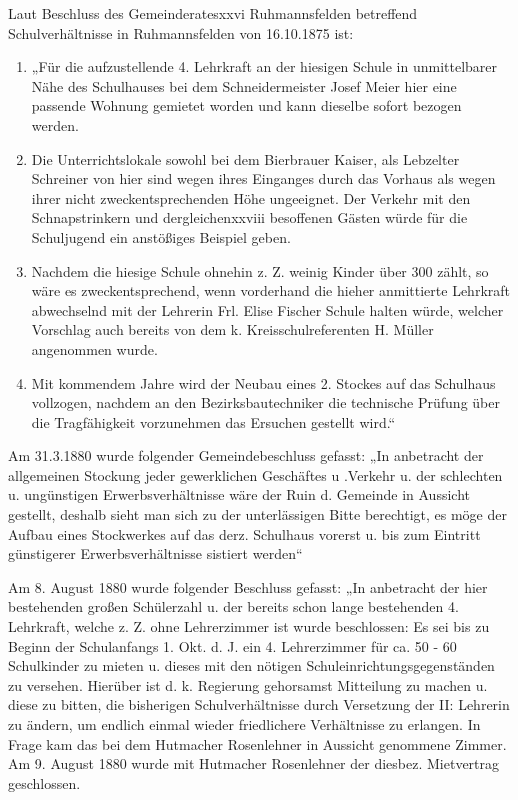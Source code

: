 \documentclass[12pt,a4paper]{book}
\begin{document}
Laut Beschluss des Gemeinderatesxxvi Ruhmannsfelden betreffend
Schulverhältnisse in Ruhmannsfelden von 16.10.1875 ist:

\begin{enumerate}
\item „Für die aufzustellende 4. Lehrkraft an der hiesigen Schule in unmittelbarer
Nähe des Schulhauses bei dem Schneidermeister Josef Meier hier eine passende
Wohnung gemietet worden und kann dieselbe sofort bezogen werden.

\item Die Unterrichtslokale sowohl bei dem Bierbrauer Kaiser, als Lebzelter
Schreiner von hier sind wegen ihres Einganges durch das Vorhaus als wegen ihrer
nicht zweckentsprechenden Höhe ungeeignet. Der Verkehr mit den Schnapstrinkern
und dergleichenxxviii besoffenen Gästen würde für die Schuljugend ein anstößiges
Beispiel geben.

\item Nachdem die hiesige Schule ohnehin z. Z. weinig Kinder über 300 zählt, so
wäre es zweckentsprechend, wenn vorderhand die hieher anmittierte Lehrkraft
abwechselnd mit der Lehrerin Frl. Elise Fischer Schule halten würde, welcher
Vorschlag auch bereits von dem k. Kreisschulreferenten H. Müller angenommen
wurde.

\item Mit kommendem Jahre wird der Neubau eines 2. Stockes auf das Schulhaus
vollzogen, nachdem an den Bezirksbautechniker die technische Prüfung über die
Tragfähigkeit vorzunehmen das Ersuchen gestellt wird.“
\end{enumerate}

Am 31.3.1880 wurde folgender Gemeindebeschluss gefasst: „In anbetracht der
allgemeinen Stockung jeder gewerklichen Geschäftes u .Verkehr u. der schlechten
u. ungünstigen Erwerbsverhältnisse wäre der Ruin d. Gemeinde in Aussicht
gestellt, deshalb sieht man sich zu der unterlässigen Bitte berechtigt, es möge
der Aufbau eines Stockwerkes auf das derz. Schulhaus vorerst u. bis zum Eintritt
günstigerer Erwerbsverhältnisse sistiert werden“

Am 8. August 1880 wurde folgender Beschluss gefasst: „In anbetracht der hier
bestehenden großen Schülerzahl u. der bereits schon lange bestehenden 4.
Lehrkraft, welche z. Z. ohne Lehrerzimmer ist wurde beschlossen: Es sei bis zu
Beginn der Schulanfangs 1. Okt. d. J. ein 4. Lehrerzimmer für ca. 50 - 60
Schulkinder zu mieten u. dieses mit den nötigen Schuleinrichtungsgegenständen zu
versehen. Hierüber ist d. k. Regierung gehorsamst Mitteilung zu machen u. diese
zu bitten, die bisherigen Schulverhältnisse durch Versetzung der II: Lehrerin zu
ändern, um endlich einmal wieder friedlichere Verhältnisse zu erlangen. In Frage
kam das bei dem Hutmacher Rosenlehner in Aussicht genommene Zimmer. Am 9. August
1880 wurde mit Hutmacher Rosenlehner der diesbez. Mietvertrag geschlossen.
\end{document}
